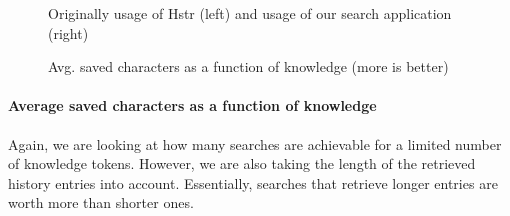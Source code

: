 \begin{figure}[h!]
\centering
{}\hfill
{}
\caption{Avg. saved characters as a function of knowledge (more is better)}
\small{Originally usage of Hstr (left) and usage of our search application (right)}
\label{eval-metrics-plot-chars}
\end{figure}


\paragraph{Average saved characters as a function of knowledge}

Again, we are looking at how many searches are achievable for a limited number of knowledge tokens. However, we are also taking the length of the retrieved history entries into account. Essentially, searches that retrieve longer entries are worth more than shorter ones.


